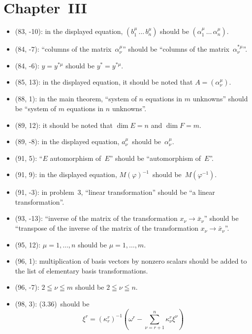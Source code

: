 \documentclass[letterpaper,12pt]{article}
\begin{document}
\section*{Chapter~III}
\begin{itemize}
\item (83, -10): in the displayed equation, \((b^{\mu}_1\,\ldots\,b^{\mu}_n)\) should be \((\alpha^{\mu}_1\,\ldots\,\alpha^{\mu}_n)\).
\item (84, -7): ``columns of the matrix~\(\alpha^{\mu}_{\nu}\)'' should be ``columns of the matrix~\(\alpha^{*\mu}_{\nu}\)''.
\item (84, -6): \(y=y^{*\mu}\) should be \(y^*=y^{*\mu}\).
\item (85, 13): in the displayed equation, it should be noted that \(A=(\alpha^{\mu}_{\nu})\).
\item (88, 1): in the main theorem, ``system of \(n\) equations in \(m\) unknowns'' should be ``system of \(m\) equations in \(n\) unknowns''.
\item (89, 12): it should be noted that \(\dim E=n\) and \(\dim F=m\).
\item (89, -8): in the displayed equation, \(a^{\mu}_{\nu}\)~should be~\(\alpha^{\mu}_{\nu}\).
\item (91, 5): ``\(E\) automorphism of~\(E\)'' should be ``automorphism of~\(E\)''.
\item (91, 9): in the displayed equation, \(M(\varphi)^{-1}\)~should be~\(M(\varphi^{-1})\).
\item (91, -3): in problem~3, ``linear transformation'' should be ``a linear transformation''.
\item (93, -13): ``inverse of the matrix of the transformation \(x_{\nu}\to\bar{x}_{\nu}\)'' should be ``transpose of the inverse of the matrix of the transformation \(x_{\nu}\to\bar{x}_{\nu}\)''.
\item (95, 12): \(\mu=1,\ldots,n\) should be \(\mu=1,\ldots,m\).
\item (96, 1): multiplication of basis vectors by nonzero scalars should be added to the list of elementary basis transformations.
\item (96, -7): \(2\leqq\nu\leqq m\) should be \(2\leqq\nu\leqq n\).
\item (98, 3): (3.36)~should be
\[\xi^r=(\kappa^r_r)^{-1}\left(\omega^r-\sum_{\nu=r+1}^n\kappa^r_{\nu}\xi^{\nu}\right)\]
\end{itemize}
\end{document}
